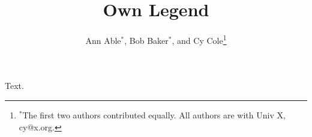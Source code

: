 \documentclass{article}
\title{Own Legend}
\author{Ann Able$^*$, Bob Baker$^*$, and Cy Cole\thanks{$^*$The first two authors contributed equally. All authors
are with Univ X, cy@x.org.}}
\begin{document}
\maketitle
Text.
\end{document}
